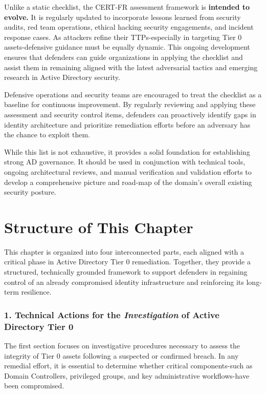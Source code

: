 Unlike a static checklist, the CERT-FR assessment framework is \textbf{intended to evolve.} It is regularly updated to incorporate lessons learned from security audits, red team operations, ethical hacking security engagements, and incident response cases. As attackers refine their TTPs-especially in targeting Tier 0 assets-defensive guidance must be equally dynamic. This ongoing development ensures that defenders can guide organizations in applying the checklist and assist them in remaining aligned with the latest adversarial tactics and emerging research in Active Directory security.

Defensive operations and security teams are encouraged to treat the checklist as a baseline for continuous improvement. By regularly reviewing and applying these assessment and security control items, defenders can proactively identify gaps in identity architecture and prioritize remediation efforts before an adversary has the chance to exploit them.

While this list is not exhaustive, it provides a solid foundation for establishing strong AD governance. It should be used in conjunction with technical tools, ongoing architectural reviews, and manual verification and validation efforts to develop a comprehensive picture and road-map of the domain's overall existing security posture.

\section{Structure of This Chapter}
This chapter is organized into four interconnected parts, each aligned with a critical phase in Active Directory Tier 0 remediation. Together, they provide a structured, technically grounded framework to support defenders in regaining control of an already compromised identity infrastructure and reinforcing its long-term resilience.

\subsubsection{1. Technical Actions for the \textit{Investigation} of Active Directory Tier 0}
The first section focuses on investigative procedures necessary to assess the integrity of Tier 0 assets following a suspected or confirmed breach. In any remedial effort, it is essential to determine whether critical components-such as Domain Controllers, privileged groups, and key administrative workflows-have been compromised.

